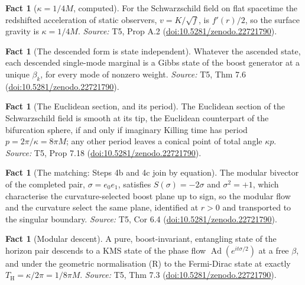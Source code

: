 \documentclass[11pt]{article}
\theoremstyle{definition}
\newtheorem{fact}[theorem]{Fact}
\theoremstyle{plain}
\providecommand{\TH}{}\renewcommand{\TH}{T_{\mathrm{H}}}
\begin{document}
\begin{fact}[$\kappa = 1/4M$, computed]\label{c:singularity.computed}
For the Schwarzschild field on flat spacetime the redshifted acceleration of static observers, $v = K/\sqrt f$, is $f'(r)/2$, so the surface gravity is $\kappa = 1/4M$.
\emph{Source:} T5, Prop A.2 (\href{https://doi.org/10.5281/zenodo.22721790}{doi:10.5281/zenodo.22721790}).
\end{fact}

\begin{fact}[The descended form is state independent]\label{c:singularity.descended-form-state-independent}
Whatever the ascended state, each descended single-mode marginal is a Gibbs state of the boost generator at a unique $\beta_k$, for every mode of nonzero weight.
\emph{Source:} T5, Thm 7.6 (\href{https://doi.org/10.5281/zenodo.22721790}{doi:10.5281/zenodo.22721790}).
\end{fact}

\begin{fact}[The Euclidean section, and its period]\label{c:singularity.euclidean-section-period}
The Euclidean section of the Schwarzschild field is smooth at its tip, the Euclidean counterpart of the bifurcation sphere, if and only if imaginary Killing time has period $p = 2\pi/\kappa = 8\pi M$; any other period leaves a conical point of total angle $\kappa p$.
\emph{Source:} T5, Prop 7.18 (\href{https://doi.org/10.5281/zenodo.22721790}{doi:10.5281/zenodo.22721790}).
\end{fact}

\begin{fact}[The matching: Steps 4b and 4c join by equation]\label{c:singularity.matching-steps-4b-4c-join-equation}
The modular bivector of the completed pair, $\sigma = e_0e_1$, satisfies $S(\sigma) = -2\sigma$ and $\sigma^2 = +1$, which characterise the curvature-selected boost plane up to sign, so the modular flow and the curvature select the same plane, identified at $r > 0$ and transported to the singular boundary.
\emph{Source:} T5, Cor 6.4 (\href{https://doi.org/10.5281/zenodo.22721790}{doi:10.5281/zenodo.22721790}).
\end{fact}

\begin{fact}[Modular descent]\label{c:singularity.modular-descent}
A pure, boost-invariant, entangling state of the horizon pair descends to a KMS state of the phase flow $\operatorname{Ad}(e^{it\sigma/2})$ at a free $\beta$, and under the geometric normalisation (R) to the Fermi-Dirac state at exactly $\TH = \kappa/2\pi = 1/8\pi M$.
\emph{Source:} T5, Thm 7.3 (\href{https://doi.org/10.5281/zenodo.22721790}{doi:10.5281/zenodo.22721790}).
\end{fact}
\end{document}
